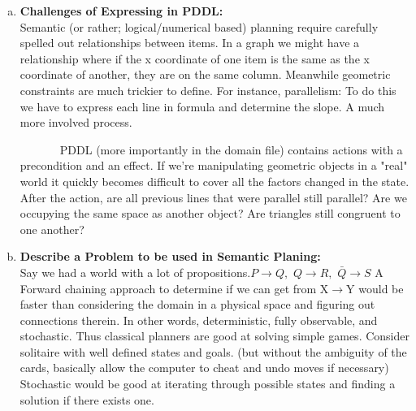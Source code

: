 \documentclass[]{article}
\begin{document}
\begin{enumerate}[(a)]
		\item \textbf{Challenges of Expressing in PDDL:}\\
		Semantic (or rather; logical/numerical based) planning require carefully spelled out relationships between items. In a graph we might have a relationship where if the x coordinate of one item is the same as the x coordinate of another, they are on the same column. Meanwhile geometric constraints are much trickier to define. For instance, parallelism: To do this we have to express each line in formula and determine the slope. A much more involved process. 
		
		~~~~~~~PDDL (more importantly in the domain file) contains actions with a precondition and an effect. If we're manipulating geometric objects in a "real" world it quickly becomes difficult to cover all the factors changed in the state. After the action, are all previous lines that were parallel still parallel? Are we occupying the same space as another object? Are triangles still congruent to one another?\\
		\item \textbf{Describe a Problem to be used in Semantic Planing:}\\
		Say we had a world with a lot of propositions.\( P\rightarrow Q,\) \(Q\rightarrow R,\) \(\bar{Q}\rightarrow S\) A Forward chaining approach to determine if we can get from X\(\rightarrow\)Y would be faster than considering the domain in a physical space and figuring out connections therein. In other words, deterministic, fully observable, and stochastic. Thus classical planners are good at solving simple games. Consider solitaire with well defined states and goals. (but without the ambiguity of the cards, basically allow the computer to cheat and undo moves if necessary) Stochastic would be good at iterating through possible states and finding a solution if there exists one.
	\end{enumerate}
\end{document}
